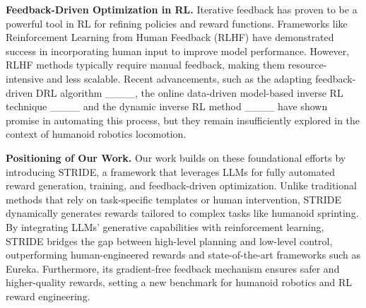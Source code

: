 \textbf{Feedback-Driven Optimization in RL.}
Iterative feedback has proven to be a powerful tool in RL for refining policies and reward functions. Frameworks like Reinforcement Learning from Human Feedback (RLHF) have demonstrated success in incorporating human input to improve model performance. However, RLHF methods typically require manual feedback, making them resource-intensive and less scalable. Recent advancements, such as the adapting feedback-driven DRL algorithm ____, the online data-driven model-based inverse RL technique ____ and the dynamic inverse RL method ____ have shown promise in automating this process, but they remain insufficiently explored in the context of humanoid robotics locomotion.

\textbf{Positioning of Our Work.}
Our work builds on these foundational efforts by introducing STRIDE, a framework that leverages LLMs for fully automated reward generation, training, and feedback-driven optimization. Unlike traditional methods that rely on task-specific templates or human intervention, STRIDE dynamically generates rewards tailored to complex tasks like humanoid sprinting. By integrating LLMs' generative capabilities with reinforcement learning, STRIDE bridges the gap between high-level planning and low-level control, outperforming human-engineered rewards and state-of-the-art frameworks such as Eureka. Furthermore, its gradient-free feedback mechanism ensures safer and higher-quality rewards, setting a new benchmark for humanoid robotics and RL reward engineering.